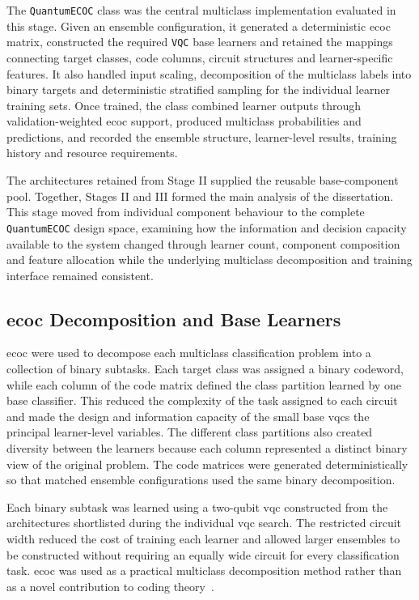 \documentclass[]{UCD_CS_MSc_AAI_Report}
\begin{document}
The \texttt{QuantumECOC} class was the central multiclass implementation evaluated in this stage. Given an ensemble configuration, it generated a deterministic \ac{ecoc} matrix, constructed the required \texttt{VQC} base learners and retained the mappings connecting target classes, code columns, circuit structures and learner-specific features. It also handled input scaling, decomposition of the multiclass labels into binary targets and deterministic stratified sampling for the individual learner training sets. Once trained, the class combined learner outputs through validation-weighted \ac{ecoc} support, produced multiclass probabilities and predictions, and recorded the ensemble structure, learner-level results, training history and resource requirements.

The architectures retained from Stage II supplied the reusable base-component pool. Together, Stages II and III formed the main analysis of the dissertation. This stage moved from individual component behaviour to the complete \texttt{QuantumECOC} design space, examining how the information and decision capacity available to the system changed through learner count, component composition and feature allocation while the underlying multiclass decomposition and training interface remained consistent.

\subsection{\acs*{ecoc} Decomposition and Base Learners}

\ac{ecoc} were used to decompose each multiclass classification problem into a collection of binary subtasks. Each target class was assigned a binary \gls{codeword}, while each column of the code matrix defined the class partition learned by one base classifier. This reduced the complexity of the task assigned to each circuit and made the design and information capacity of the small base \acp{vqc} the principal learner-level variables. The different class partitions also created diversity between the learners because each column represented a distinct binary view of the original problem. The code matrices were generated deterministically so that matched ensemble configurations used the same binary decomposition.

Each binary subtask was learned using a two-qubit \ac{vqc} constructed from the architectures shortlisted during the individual \ac{vqc} search. The restricted circuit width reduced the cost of training each learner and allowed larger ensembles to be constructed without requiring an equally wide circuit for every classification task. \ac{ecoc} was used as a practical multiclass decomposition method rather than as a novel contribution to coding theory~\cite{nguyen_optimal_2021}.
\end{document}
